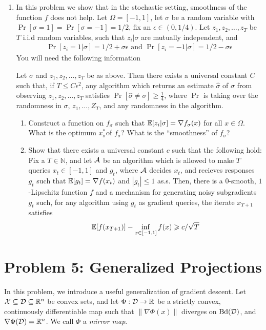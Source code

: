 \documentclass[12pt]{article}
\begin{document}
\begin{enumerate}
\item 
In this problem we show that in the stochastic setting, smoothness of the function $f$ does not help. Let $\Omega = [-1,1]$, let $\sigma$ be a random variable with $\Pr[\sigma = 1] = \Pr[\sigma = -1] = 1/2$, fix an $\epsilon \in (0,1/4)$. Let $z_1,z_2,\dots,z_T$ be $T$ i.i.d random variables, such that $z_i | \sigma$ are mutually independent, and 
\begin{eqnarray}
\Pr[z_i =  1 | \sigma] = 1/2 + \sigma \epsilon \text{ and } \Pr[z_i =  -1 | \sigma] = 1/2 - \sigma \epsilon 
\end{eqnarray}
You will need the following information
\begin{lemma*} Let $\sigma$ and $z_1,z_2,\dots,z_T$ be as above. Then there exists a universal constant $C$ such that, if $T \le C \epsilon^2$, any algorithm which returns an estimate $\widehat{\sigma}$ of $\sigma$ from observing $z_1,z_2,\dots,z_T$ satisfies $\Pr[\widehat{\sigma} \ne \sigma] \ge \frac{1}{4}$, where $\Pr$ is taking over the randomness in $\sigma$, $z_1,\dots,Z_T$, and any randomness in the algorithm. 
\end{lemma*}
\begin{enumerate}
\item
Construct a function on $f_{\sigma}$ such that $\operatorname*{\mathbb{E}}[z_i | \sigma] = \nabla f_{\sigma}(x)$ for all $x \in \Omega$. What is the optimum $x^*_{\sigma} $of $f_{\sigma}$? What is the ``smoothness'' of $f_{\sigma}$?
\item 
Show that there exists a universal constant $c$ such that the following hold: Fix a $T \in \mathbb{N}$, and let ${\cal A}$ be an algorithm which is allowed to make $T$ queries $x_t \in [-1,1]$ and $g_t$, where ${\cal A}$ decides $x_t$, and recieves responses $g_t$ such that $\operatorname*{\mathbb{E}}[g_t] = \nabla f(x_t)$ and $|g_t| \le 1$ as.s. Then, there is a $0$-smooth, $1$-Lipschitz function $f$ and a mechanism for generating noisy subgradients $g_t$ such, for any algorithm using $g_t$ as gradient queries, the iterate $x_{T+1}$ satisfies
\begin{eqnarray}
\operatorname*{\mathbb{E}}[f(x_{T+1})] - \inf_{x \in [-1,1]} f(x)\geqslant c /\sqrt{T}
\end{eqnarray}
\end{enumerate}
\end{enumerate}
\section*{Problem 5: Generalized Projections}

In this problem, we introduce a useful generalization of gradient descent. Let
${\cal X} \subseteq {\cal D} \subseteq \mathbb{R}^n$ be convex sets, and let $\Phi: {\cal D} \to \mathbb{R}$ be
a strictly convex, continuously differentiable map such that $\|\nabla
\Phi(x)\|$ diverges on $\mathrm{Bd}({\cal D})$, and $\nabla \Phi({\cal D}) = \mathbb{R}^n$. We call $\Phi$ a \emph{mirror map}.
\end{document}
